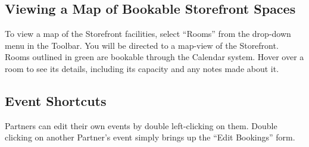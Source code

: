 \subsection{Viewing a Map of Bookable Storefront Spaces}

To view a map of the Storefront facilities, select ``Rooms'' from the drop-down menu in the Toolbar. You will be directed to a map-view of the Storefront. Rooms outlined in green are bookable through the Calendar system. Hover over a room to see its details, including its capacity and any notes made about it.


\subsection{Event Shortcuts}

Partners can edit their own events by double left-clicking on them. Double clicking on another Partner's event simply brings up the ``Edit Bookings'' form.

